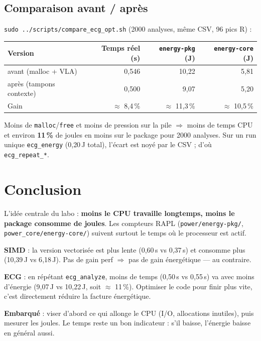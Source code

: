 \documentclass[a4paper,12pt]{article}
\begin{document}
\subsection{Comparaison avant / après}
\texttt{sudo ../scripts/compare\_ecg\_opt.sh} (2000 analyses, même CSV, 96 pics R) :

\begin{center}
\begin{tabular}{|l|r|r|r|}
\hline
Version & Temps réel (s) & \texttt{energy-pkg} (J) & \texttt{energy-core} (J) \\
\hline
avant (malloc + VLA) & 0{,}546 & 10{,}22 & 5{,}81 \\
après (tampons contexte) & 0{,}500 & 9{,}07 & 5{,}20 \\
\hline
Gain & $\approx$ 8{,}4\,\% & $\approx$ 11{,}3\,\% & $\approx$ 10{,}5\,\% \\
\hline
\end{tabular}
\end{center}

Moins de \texttt{malloc}/\texttt{free} et moins de pression sur la pile $\Rightarrow$ moins de temps CPU et environ \textbf{11\,\%} de joules en moins sur le package pour 2000 analyses. Sur un run unique \texttt{ecg\_energy} (0{,}20\,J total), l'écart est noyé par le CSV ; d'où \texttt{ecg\_repeat\_*}.

\section{Conclusion}
L'idée centrale du labo : \textbf{moins le CPU travaille longtemps, moins le package consomme de joules}. Les compteurs RAPL (\texttt{power/energy-pkg/}, \texttt{power\_core/energy-core/}) suivent surtout le temps où le processeur est actif.

\textbf{SIMD} : la version vectorisée est plus lente (0{,}60\,s vs 0{,}37\,s) et consomme plus (10{,}39\,J vs 6{,}18\,J). Pas de gain perf $\Rightarrow$ pas de gain énergétique --- au contraire.

\textbf{ECG} : en répétant \texttt{ecg\_analyze}, moins de temps (0{,}50\,s vs 0{,}55\,s) va avec moins d'énergie (9{,}07\,J vs 10{,}22\,J, soit $\approx$ 11\,\%). Optimiser le code pour finir plus vite, c'est directement réduire la facture énergétique.

\textbf{Embarqué} : viser d'abord ce qui allonge le CPU (I/O, allocations inutiles), puis mesurer les joules. Le temps reste un bon indicateur : s'il baisse, l'énergie baisse en général aussi.
\end{document}
